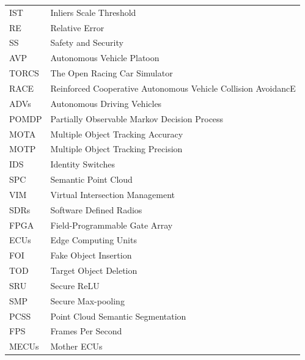 \documentclass[a4paper,12pt]{article}
\begin{document}
\begin{center}
\begin{longtable}{|l|l|}
IST & Inliers Scale Threshold \\

RE & Relative Error\\

SS & Safety and Security \\

AVP & Autonomous Vehicle Platoon \\

TORCS & The Open Racing Car Simulator \\

RACE & Reinforced Cooperative Autonomous Vehicle Collision AvoidancE \\

ADVs & Autonomous Driving Vehicles \\

POMDP & Partially Observable Markov Decision Process \\

MOTA & Multiple Object Tracking Accuracy \\

MOTP & Multiple Object Tracking Precision \\

IDS & Identity Switches \\

SPC & Semantic Point Cloud \\

VIM & Virtual Intersection Management \\

SDRs & Software Defined Radios \\

FPGA & Field-Programmable Gate Array \\

ECUs & Edge Computing Units \\

FOI & Fake Object Insertion \\

TOD & Target Object Deletion \\

SRU & Secure ReLU \\

SMP & Secure Max-pooling \\

PCSS & Point Cloud Semantic Segmentation \\

FPS & Frames Per Second \\

MECUs & Mother ECUs \\


\end{longtable}
\end{center}
\end{document}
